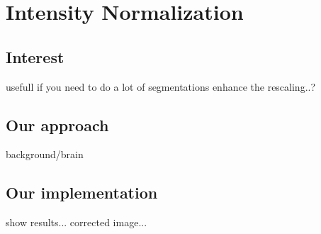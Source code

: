 \section{Intensity Normalization}
\subsection{Interest}
usefull if you need to do a lot of segmentations
enhance the rescaling..?
\subsection{Our approach}
background/brain
\subsection{Our implementation}
show results... corrected image...

